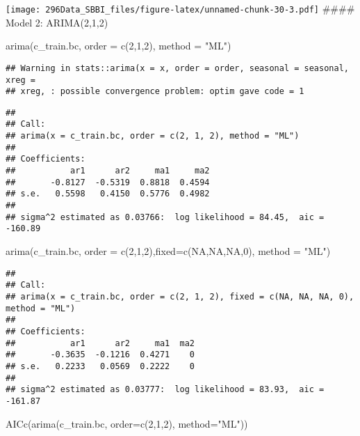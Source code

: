 \documentclass[
]{article}
\newenvironment{Shaded}{\begin{snugshade}}{\end{snugshade}}
\newcommand{\AttributeTok}[1]{\textcolor[rgb]{0.77,0.63,0.00}{#1}}
\newcommand{\ConstantTok}[1]{\textcolor[rgb]{0.00,0.00,0.00}{#1}}
\newcommand{\DecValTok}[1]{\textcolor[rgb]{0.00,0.00,0.81}{#1}}
\newcommand{\FunctionTok}[1]{\textcolor[rgb]{0.00,0.00,0.00}{#1}}
\newcommand{\NormalTok}[1]{#1}
\newcommand{\StringTok}[1]{\textcolor[rgb]{0.31,0.60,0.02}{#1}}
\begin{document}
\texttt{[image: 296Data\_SBBI\_files/figure-latex/unnamed-chunk-30-3.pdf]}
\#\#\#\# Model 2: ARIMA(2,1,2)

\begin{Shaded}
\begin{Highlighting}[]
\FunctionTok{arima}\NormalTok{(c\_train.bc, }\AttributeTok{order =} \FunctionTok{c}\NormalTok{(}\DecValTok{2}\NormalTok{,}\DecValTok{1}\NormalTok{,}\DecValTok{2}\NormalTok{), }\AttributeTok{method =} \StringTok{"ML"}\NormalTok{)}
\end{Highlighting}
\end{Shaded}

\begin{verbatim}
## Warning in stats::arima(x = x, order = order, seasonal = seasonal, xreg =
## xreg, : possible convergence problem: optim gave code = 1
\end{verbatim}

\begin{verbatim}
## 
## Call:
## arima(x = c_train.bc, order = c(2, 1, 2), method = "ML")
## 
## Coefficients:
##           ar1      ar2     ma1     ma2
##       -0.8127  -0.5319  0.8818  0.4594
## s.e.   0.5598   0.4150  0.5776  0.4982
## 
## sigma^2 estimated as 0.03766:  log likelihood = 84.45,  aic = -160.89
\end{verbatim}

\begin{Shaded}
\begin{Highlighting}[]
\FunctionTok{arima}\NormalTok{(c\_train.bc, }\AttributeTok{order =} \FunctionTok{c}\NormalTok{(}\DecValTok{2}\NormalTok{,}\DecValTok{1}\NormalTok{,}\DecValTok{2}\NormalTok{),}\AttributeTok{fixed=}\FunctionTok{c}\NormalTok{(}\ConstantTok{NA}\NormalTok{,}\ConstantTok{NA}\NormalTok{,}\ConstantTok{NA}\NormalTok{,}\DecValTok{0}\NormalTok{), }\AttributeTok{method =} \StringTok{"ML"}\NormalTok{)}
\end{Highlighting}
\end{Shaded}

\begin{verbatim}
## 
## Call:
## arima(x = c_train.bc, order = c(2, 1, 2), fixed = c(NA, NA, NA, 0), method = "ML")
## 
## Coefficients:
##           ar1      ar2     ma1  ma2
##       -0.3635  -0.1216  0.4271    0
## s.e.   0.2233   0.0569  0.2222    0
## 
## sigma^2 estimated as 0.03777:  log likelihood = 83.93,  aic = -161.87
\end{verbatim}

\begin{Shaded}
\begin{Highlighting}[]
\FunctionTok{AICc}\NormalTok{(}\FunctionTok{arima}\NormalTok{(c\_train.bc, }\AttributeTok{order=}\FunctionTok{c}\NormalTok{(}\DecValTok{2}\NormalTok{,}\DecValTok{1}\NormalTok{,}\DecValTok{2}\NormalTok{), }\AttributeTok{method=}\StringTok{"ML"}\NormalTok{)) }
\end{Highlighting}
\end{Shaded}
\end{document}

